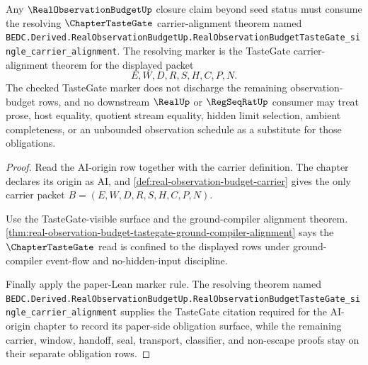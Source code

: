 \begin{theorem}
\label{thm:real-observation-budget-tastegate-target-consumption}
Any $\RealObservationBudgetUp$ closure claim beyond seed status must consume the resolving $\ChapterTasteGate$ carrier-alignment theorem named \texttt{BEDC.Derived.RealObservationBudgetUp.RealObservationBudgetTasteGate\_single\_carrier\_alignment}. The resolving marker is the TasteGate carrier-alignment theorem for the displayed packet
$$
E,W,D,R,S,H,C,P,N.
$$
The checked TasteGate marker does not discharge the remaining observation-budget rows, and no downstream $\RealUp$ or $\RegSeqRatUp$ consumer may treat prose, host equality, quotient stream equality, hidden limit selection, ambient completeness, or an unbounded observation schedule as a substitute for those obligations.
\end{theorem}
\begin{proof}
Read the AI-origin row together with the carrier definition. The chapter declares its origin as AI, and \autoref{def:real-observation-budget-carrier} gives the only carrier packet $B=(E,W,D,R,S,H,C,P,N)$.

Use the TasteGate-visible surface and the ground-compiler alignment theorem. \autoref{thm:real-observation-budget-tastegate-ground-compiler-alignment} says the $\ChapterTasteGate$ read is confined to the displayed rows under ground-compiler event-flow and no-hidden-input discipline.

Finally apply the paper-Lean marker rule. The resolving theorem named \texttt{BEDC.Derived.RealObservationBudgetUp.RealObservationBudgetTasteGate\_single\_carrier\_alignment} supplies the TasteGate citation required for the AI-origin chapter to record its paper-side obligation surface, while the remaining carrier, window, handoff, seal, transport, classifier, and non-escape proofs stay on their separate obligation rows.
\end{proof}



